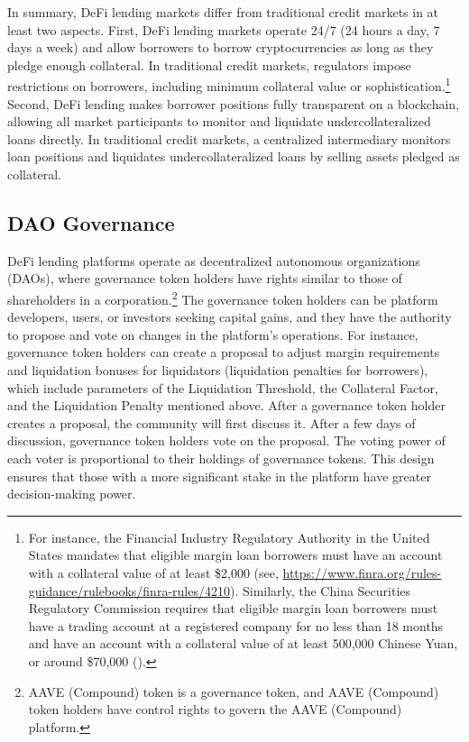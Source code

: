 \documentclass[12pt]{article}
\begin{document}
 
In summary, DeFi lending markets differ from traditional credit markets in at least two aspects. First, DeFi lending markets operate 24/7 (24 hours a day, 7 days a week) and allow borrowers to borrow cryptocurrencies as long as they pledge enough collateral. In traditional credit markets, regulators impose restrictions on borrowers, including minimum collateral value or sophistication.\footnote{For instance, the Financial Industry Regulatory Authority in the United States mandates that eligible margin loan borrowers must have an account with a collateral value of at least \$2,000 (see, \href{https://www.finra.org/rules-guidance/rulebooks/finra-rules/4210}{https://www.finra.org/rules-guidance/rulebooks/finra-rules/4210}). Similarly, the China Securities Regulatory Commission requires that eligible margin loan borrowers must have a trading account at a registered company for no less than 18 months and have an account with a collateral value of at least 500,000 Chinese Yuan, or around \$70,000 (\citealp{bian2021margin}). } Second, DeFi lending makes borrower positions fully transparent on a blockchain, allowing all market participants to monitor and liquidate undercollateralized loans directly. In traditional credit markets, a centralized intermediary monitors loan positions and liquidates undercollateralized loans by selling assets pledged as collateral. 

 \subsection{DAO Governance}
DeFi lending platforms operate as decentralized autonomous organizations (DAOs), where governance token holders have rights similar to those of shareholders in a corporation.\footnote{AAVE (Compound) token is a governance token, and AAVE (Compound) token holders have control rights to govern the AAVE (Compound) platform.} The governance token holders can be platform developers, users, or investors seeking capital gains, and they have the authority to propose and vote on changes in the platform's operations. For instance, governance token holders can create a proposal to adjust margin requirements and liquidation bonuses for liquidators (liquidation penalties for borrowers), which include parameters of the Liquidation Threshold, the Collateral Factor, and the Liquidation Penalty mentioned above. After a governance token holder creates a proposal, the community will first discuss it. After a few days of discussion, governance token holders vote on the proposal. The voting power of each voter is proportional to their holdings of governance tokens. This design ensures that those with a more significant stake in the platform have greater decision-making power.
\end{document}
